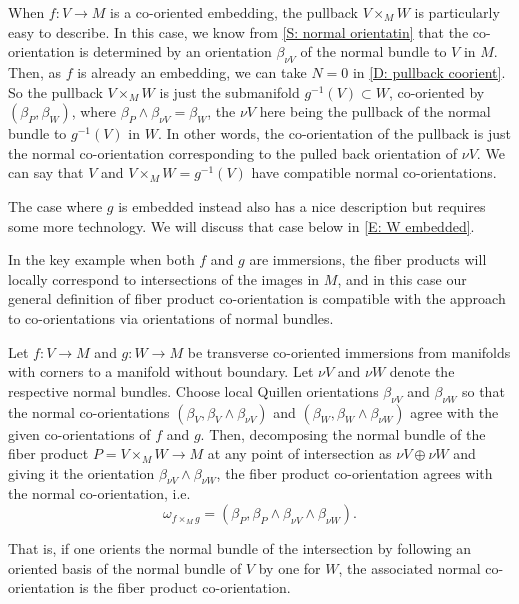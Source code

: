 \begin{example}\label{E: V embedded}
	When $f \colon V \to M$ is a co-oriented embedding, the pullback $V\times_MW$ is particularly easy to describe.
	In this case, we know from \cref{S: normal orientatin} that the co-orientation is determined by an orientation $\beta_{\nu V}$ of the normal bundle to $V$ in $M$.
	Then, as $f$ is already an embedding, we can take $N=0$ in \cref{D: pullback coorient}.
	So the pullback $V\times_MW$ is just the submanifold $g^{-1}(V)\subset W$, co-oriented by $(\beta_P,\beta_W)$, where $\beta_P\wedge \beta_{\nu V}=\beta_W$, the $\nu V$ here being the pullback of the normal bundle to $g^{-1}(V)$ in $W$.
	In other words, the co-orientation of the pullback is just the normal co-orientation corresponding to the pulled back orientation of $\nu V$.
	We can say that $V$ and $V\times_MW =g^{-1}(V)$ have compatible normal co-orientations.

	The case where $g$ is embedded instead also has a nice description but requires some more technology.
	We will discuss that case below in \cref{E: W embedded}.
\end{example}

In the key example when both $f$ and $g$ are immersions, the fiber products will locally correspond to intersections of the images in $M$, and in this case our general definition of fiber product co-orientation is compatible with the approach to co-orientations via orientations of normal bundles.

\begin{proposition}\label{P: normal pullback}
	Let $f : V \to M$ and $g: W \to M$ be transverse co-oriented immersions from manifolds with corners to a manifold without boundary.
	Let $\nu V$ and $\nu W$ denote the respective normal bundles.
	Choose local Quillen orientations $\beta_{\nu V}$ and $\beta_{\nu W}$ so that the normal co-orientations $(\beta_V,\beta_V\wedge \beta_{\nu V})$ and $(\beta_W,\beta_W\wedge \beta_{\nu W})$ agree with the given co-orientations of $f$ and $g$.
	Then, decomposing the normal bundle of the fiber product $P=V\times_M W\to M$ at any point of intersection as $\nu V \oplus \nu W$ and giving it the orientation $\beta_{\nu V}\wedge \beta_{\nu W}$, the fiber product co-orientation agrees with the normal co-orientation, i.e.\
	$$\omega_{f\times_M g}=(\beta_P,\beta_P\wedge \beta_{\nu V}\wedge \beta_{\nu W}).$$
\end{proposition}

That is, if one orients the normal bundle of the intersection by following an oriented basis of the normal bundle of $V$ by one for $W$,
the associated normal co-orientation is the fiber product co-orientation.

